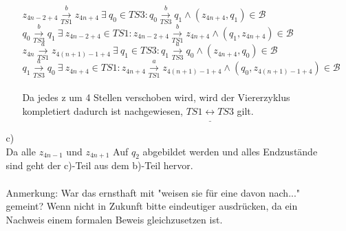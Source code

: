 \documentclass[a4paper,11pt,fleqn]{scrartcl}
\begin{document}
\begin{enumerate}
\begin{enumerate}
\begin{enumerate}
					\(z_{4n-2+4}\overset{b}{\underset{TS1}{\rightarrow}}z_{4n+4}\ \exists\ q_0 \in 
					TS3:q_0\overset{b}{\underset{TS3}{\rightarrow}}q_1 \land (z_{4n+4},q_1)\in \mathcal{B}\) \\
					
					\(q_0\overset{b}{\underset{TS3}{\rightarrow}}q_1\ \exists\ z_{4n-2+4} \in 
					TS1:z_{4n-2+4}\overset{b}{\underset{TS1}{\rightarrow}}z_{4n+4} \land (q_1,z_{4n+4})\in
					\mathcal{B}\) \\
					
					\(z_{4n}\overset{a}{\underset{TS1}{\rightarrow}}z_{4(n+1)-1+4}\ \exists\ q_1 \in 
					TS3:q_1\overset{a}{\underset{TS3}{\rightarrow}}q_0 \land (z_{4n+4},q_0)\in \mathcal{B}\) \\
					
					\(q_1\overset{a}{\underset{TS3}{\rightarrow}}q_0\ \exists\ z_{4n+4} \in 
					TS1:z_{4n+4}\overset{a}{\underset{TS1}{\rightarrow}}z_{4(n+1)-1+4} \land 
					(q_0,z_{4(n+1)-1+4})\in
					\mathcal{B}\) \\ \\
					Da jedes z um 4 Stellen verschoben wird, wird der Viererzyklus kompletiert dadurch ist 
					nachgewiesen, \(TS1\underline{\leftrightarrow}TS3\) gilt.
			\end{enumerate}
	    	
	    	\item[c)]\quad \\ 
	    	Da alle \(z_{4n-1}\) und \(z_{4n+1}\) Auf \(q_2\) abgebildet werden und alles
	    	Endzustände sind geht der c)-Teil aus dem b)-Teil hervor. \\
	    	\\
	    	Anmerkung: War das ernsthaft mit "weisen sie für eine davon nach..." gemeint? Wenn nicht in Zukunft 
	    	bitte eindeutiger ausdrücken, da ein Nachweis einem formalen Beweis gleichzusetzen ist. \\
	    \end{enumerate}
	    

\end{enumerate}
\end{document}
